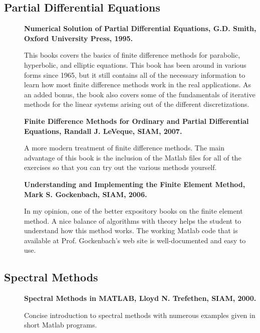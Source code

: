 \documentclass[11pt]{article}
\begin{document}
\subsection{Partial Differential Equations}
\begin{description}

\item[] {\bf Numerical Solution of Partial Differential Equations, G.D. Smith,  Oxford University Press, 1995.}  

This books covers the basics of finite difference methods for parabolic, hyperbolic, and elliptic equations.  This book has been around in various forms since 1965, but it still contains all of the necessary information to learn how most finite difference methods work in the real applications.  As an added bonus, the book also covers some of the fundamentals of iterative methods for the linear systems arising out of the different discretizations.

\item[] {\bf Finite Difference Methods for Ordinary and Partial Differential Equations, Randall J. LeVeque, SIAM, 2007.}   

A more modern treatment of finite difference methods.  The main advantage of this book is the inclusion of the Matlab files for all of the exercises so that you can try out the various methods yourself.

\item[] {\bf Understanding and Implementing the Finite Element Method, Mark S. Gockenbach, SIAM, 2006.}  

In my opinion, one of the better expository books on the finite element method.  A nice balance of algorithms with theory helps the student to understand how this method works.  The working Matlab code that is available at Prof. Gockenbach's web site is well-documented and easy to use.

\end{description}

\subsection{Spectral Methods}
\begin{description}
\item[]{\bf Spectral Methods in MATLAB, Lloyd N. Trefethen, SIAM, 2000.}  

Concise introduction to spectral methods with numerous examples given in short Matlab programs.

 \end{description}
 
\end{document}
